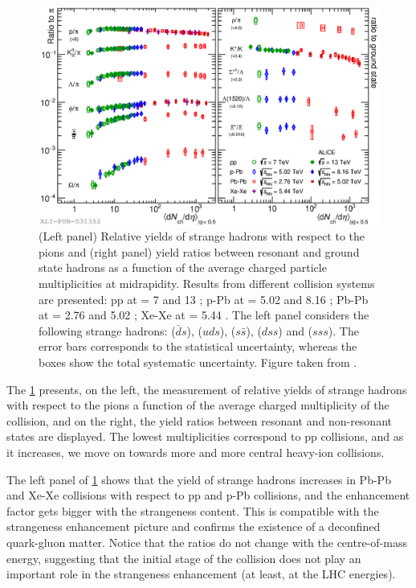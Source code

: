 \begin{figure}[h]
	\centering
	\includegraphics[width=1\textwidth]{Figs/Chapter2/fig3.2a.eps}
	\caption{(Left panel) Relative yields of strange hadrons with respect to the pions and (right panel) yield ratios between resonant and ground state hadrons as a function of the average charged particle multiplicities at midrapidity. Results from different collision systems are presented: pp at \sqrtS = 7 and 13 \tev; p-Pb at \sqrtSnn = 5.02 and 8.16 \tev; Pb-Pb at \sqrtSnn = 2.76 and 5.02 \tev; Xe-Xe at \sqrtSnn = 5.44 \tev. The left panel considers the following strange hadrons: \rmKzero ($\bar{d}s$), \rmLambda ($uds$), \rmPhi ($s\bar{s}$), \rmXi ($dss$) and \rmOmega ($sss$). The error bars corresponds to the statistical uncertainty, whereas the boxes show the total systematic uncertainty. Figure taken from \cite{alicecollaborationALICEExperimentJourney2022}.}
	\label{fig:StrangeYields}
\end{figure}

The \fig\ref{fig:StrangeYields} presents, on the left, the measurement of relative yields of strange hadrons with respect to the pions a function of the average charged multiplicity of the collision, and on the right, the yield ratios between resonant and non-resonant states are displayed. The lowest multiplicities correspond to pp collisions, and as it increases, we move on towards more and more central heavy-ion collisions.

The left panel of \fig\ref{fig:StrangeYields} shows that the yield of strange hadrons increases in Pb-Pb and Xe-Xe collisions with respect to pp and p-Pb collisions, and the enhancement factor gets bigger with the strangeness content. This is compatible with the strangeness enhancement picture and confirms the existence of a deconfined quark-gluon matter. Notice that the ratios do not change with the centre-of-mass energy, suggesting that the initial stage of the collision does not play an important role in the strangeness enhancement (at least, at the LHC energies).

